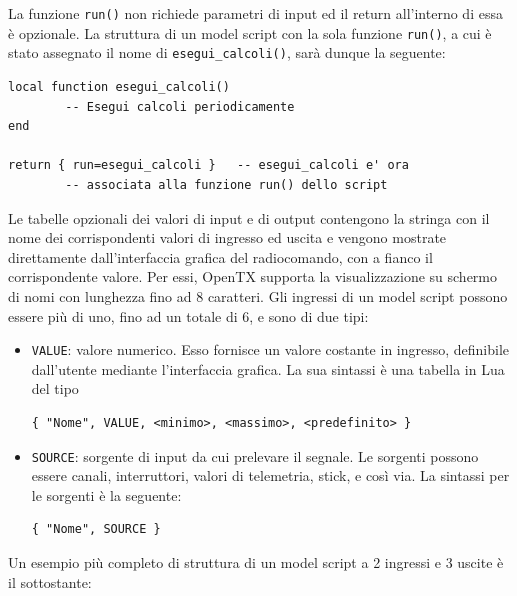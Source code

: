 \documentclass[a4paper, 12pt]{report} %
\begin{document}
La funzione \texttt{run()} non richiede parametri di input ed il return all'interno di essa è opzionale. La struttura di un model script con la sola funzione \texttt{run()}, a cui è stato assegnato il nome di \texttt{esegui\_calcoli()}, sarà dunque la seguente:

\begin{lstlisting}
local function esegui_calcoli()
        -- Esegui calcoli periodicamente
end

return { run=esegui_calcoli }   -- esegui_calcoli e' ora
        -- associata alla funzione run() dello script
\end{lstlisting}

Le tabelle opzionali dei valori di input e di output contengono la stringa con il nome dei corrispondenti valori di ingresso ed uscita e vengono mostrate direttamente dall'interfaccia grafica del radiocomando, con a fianco il corrispondente valore. Per essi, OpenTX supporta la visualizzazione su schermo di nomi con lunghezza fino ad 8 caratteri. Gli ingressi di un model script possono essere più di uno, fino ad un totale di 6, e sono di due tipi:
\begin{itemize}
        \item \texttt{VALUE}: valore numerico. Esso fornisce un valore costante in ingresso, definibile dall'utente mediante l'interfaccia grafica. La sua sintassi è una tabella in Lua del tipo 
\begin{lstlisting}
{ "Nome", VALUE, <minimo>, <massimo>, <predefinito> }
\end{lstlisting}
        \item \texttt{SOURCE}: sorgente di input da cui prelevare il segnale. Le sorgenti possono essere canali, interruttori, valori di telemetria, stick, e così via. La sintassi per le sorgenti è la seguente:
\begin{lstlisting}
{ "Nome", SOURCE }
\end{lstlisting}
\end{itemize}

Un esempio più completo di struttura di un model script a 2 ingressi e 3 uscite è il sottostante:
\end{document}
